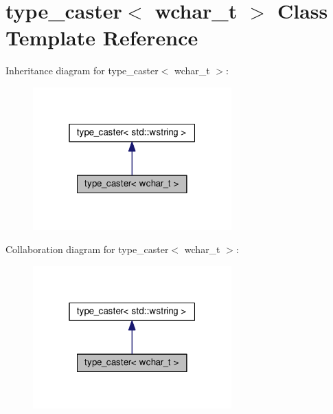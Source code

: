 \hypertarget{classtype__caster_3_01wchar__t_01_4}{}\section{type\+\_\+caster$<$ wchar\+\_\+t $>$ Class Template Reference}
\label{classtype__caster_3_01wchar__t_01_4}


Inheritance diagram for type\+\_\+caster$<$ wchar\+\_\+t $>$\+:
\nopagebreak
\begin{figure}[H]
\begin{center}
\leavevmode
\includegraphics[width=217pt]{classtype__caster_3_01wchar__t_01_4__inherit__graph}
\end{center}
\end{figure}


Collaboration diagram for type\+\_\+caster$<$ wchar\+\_\+t $>$\+:
\nopagebreak
\begin{figure}[H]
\begin{center}
\leavevmode
\includegraphics[width=217pt]{classtype__caster_3_01wchar__t_01_4__coll__graph}
\end{center}
\end{figure}
